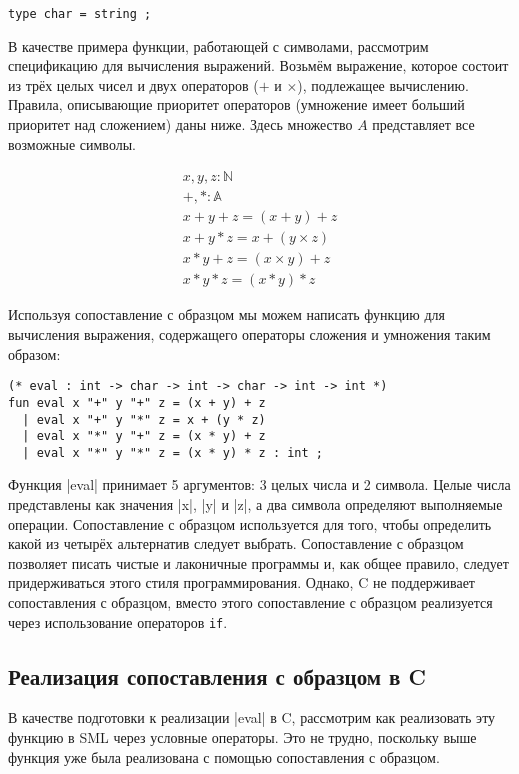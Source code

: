 \begin{lstlisting}[style=customml]
  type char = string ;
\end{lstlisting}

В качестве примера функции, работающей с символами, рассмотрим спецификацию для вычисления выражений. Возьмём выражение, которое состоит из трёх целых чисел и двух операторов ($+$ и $\times$), подлежащее вычислению. Правила, описывающие приоритет операторов (умножение имеет больший приоритет над сложением) даны ниже. Здесь множество $A$ представляет все возможные символы.

\begin{gather*}
  x, y, z : \mathbb N \\
  + , * : \mathbb A \\
  x+y+z=(x+y)+z \\
  x+y*z=x+(y \times z) \\
  x*y+z=(x \times y)+z \\
  x*y*z=(x*y)*z
\end{gather*}

Используя сопоставление с образцом мы можем написать функцию для вычисления выражения, содержащего операторы сложения и умножения таким образом:

\begin{lstlisting}[style=customml]
(* eval : int -> char -> int -> char -> int -> int *)
fun eval x "+" y "+" z = (x + y) + z
  | eval x "+" y "*" z = x + (y * z)
  | eval x "*" y "+" z = (x * y) + z
  | eval x "*" y "*" z = (x * y) * z : int ;
\end{lstlisting}

Функция \inline|eval| принимает 5 аргументов: 3 целых числа и 2 символа. Целые числа представлены как значения \inline|x|, \inline|y| и \inline|z|, а два символа определяют выполняемые операции. Сопоставление с образцом используется для того, чтобы определить какой из четырёх альтернатив следует выбрать. Сопоставление с образцом позволяет писать чистые и лаконичные программы и, как общее правило, следует придерживаться этого стиля программирования. Однако, C не поддерживает сопоставления с образцом, вместо этого сопоставление с образцом реализуется через использование операторов \lstinline|if|.

\subsection{Реализация сопоставления с образцом в C}\label{PatternMatchingC}

В качестве подготовки к реализации \inline|eval| в C, рассмотрим как реализовать эту функцию в SML через условные операторы. Это не трудно, поскольку выше функция уже была реализована с помощью сопоставления с образцом.

